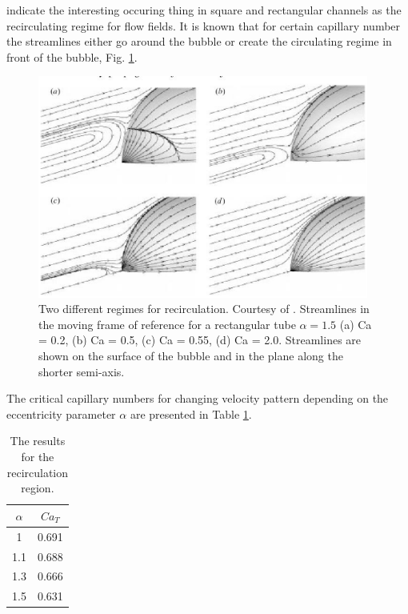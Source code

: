 \documentclass{article}
\begin{document}
\citet{heil-threedim} indicate the interesting occuring thing in square and rectangular channels
as the recirculating regime for flow fields.  It is
known that for certain capillary number the streamlines either go around the bubble or create the
circulating regime in front of the bubble, Fig. \ref{fig:heil:recirculating}.  
\begin{figure}
\includegraphics[width=0.97\textwidth]{Figures/recirculating.eps}
\caption{Two different regimes for recirculation. Courtesy of \citet{heil-threedim}. 
Streamlines in the moving frame of reference for a rectangular tube $\alpha=1.5$ (a) Ca = 0.2,
(b) Ca = 0.5, (c) Ca = 0.55, (d) Ca = 2.0. Streamlines are shown on the surface of the bubble and
in the plane along the shorter semi-axis.
\label{fig:heil:recirculating}}
\end{figure}
The critical capillary numbers for changing velocity pattern depending on the eccentricity
parameter $\alpha$ are presented in Table \ref{table:recirculation:data}.
\begin{table}
\begin{tabular}{c|c}
$\alpha$& $Ca_{T}$\\
\hline
1& 0.691\\
1.1 & 0.688\\
1.3 & 0.666\\
1.5 & 0.631\\
\end{tabular}
\caption{The results for the recirculation region.\label{table:recirculation:data}}
\end{table}
\end{document}
